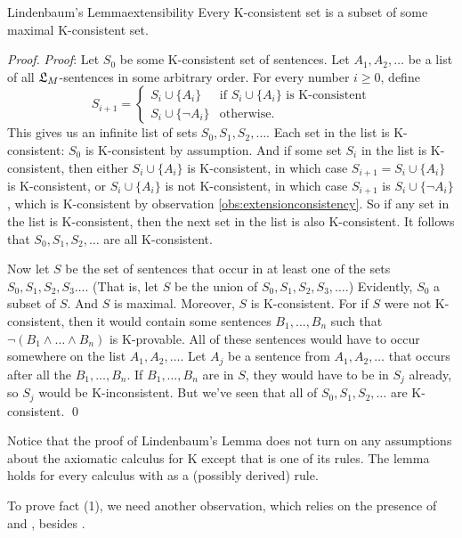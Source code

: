 \begin{theorem}{Lindenbaum's Lemma}{extensibility}
  Every K-consistent set is a subset of some maximal K-consistent set.
\end{theorem}
%
\begin{proof}
  \emph{Proof}: Let $S_0$ be some K-consistent set of sentences. Let
  $A_1,A_2,\ldots$ be a list of all $\mathfrak{L}_M$-sentences in some arbitrary
  order. For every number $i\geq 0$, define
  \[
    S_{i+1} = \begin{cases} S_i \cup \{ A_i \} & \text{if $S_i \cup \{ A_i \}$ is K-consistent}\\
      S_i \cup \{ \neg A_i \} & \text{otherwise}.
    \end{cases}
  \]
%
  This gives us an infinite list of sets $S_0,S_1,S_2,\ldots$. Each set in the
  list is K-consistent: $S_0$ is K-consistent by assumption. And if some set
  $S_i$ in the list is K-consistent, then either $S_i \cup \{ A_i \}$ is
  K-consistent, in which case $S_{i+1} = S_i \cup \{ A_i \}$ is K-consistent, or
  $S_i \cup \{ A_i \}$ is not K-consistent, in which case $S_{i+1}$ is
  $S_i \cup \{ \neg A_i \}$, which is K-consistent by observation
  \ref{obs:extensionconsistency}. So if any set in the list is K-consistent, then
  the next set in the list is also K-consistent. It follows that
  $S_0,S_1,S_2,\ldots$ are all K-consistent.

  Now let $S$ be the set of sentences that occur in at least one of the sets
  $S_{0},S_1, S_2,S_3\ldots$. (That is, let $S$ be the union of
  $S_{0},S_1,S_2,S_3,\ldots$.) Evidently, $S_0$ a subset of $S$. And $S$ is
  maximal. Moreover, $S$ is K-consistent. For if $S$ were not K-consistent, then
  it would contain some sentences $B_1,\ldots,B_n$ such that
  $\neg (B_1\land \ldots\land B_n)$ is K-provable. All of these sentences would
  have to occur somewhere on the list $A_1,A_2,\ldots$. Let $A_j$ be a sentence
  from $A_1,A_2,\ldots$ that occurs after all the $B_1,\ldots,B_n$. If
  $B_1,\ldots,B_n$ are in $S$, they would have to be in $S_j$ already, so $S_j$
  would be K-inconsistent. But we've seen that all of $S_0,S_1,S_2,\ldots$ are
  K-consistent. \qed
\end{proof}

Notice that the proof of Lindenbaum's Lemma does not turn on any assumptions
about the axiomatic calculus for K except that  is one of its rules. The
lemma holds for every calculus with  as a (possibly derived) rule.

To prove fact (1), we need another observation, which relies on the presence of
 and , besides .

